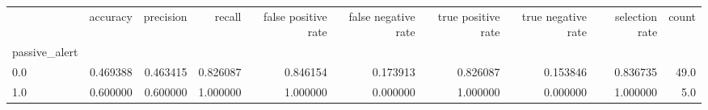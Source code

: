 \begin{tabular}{lrrrrrrrrr}
\toprule
{} &  accuracy &  precision &    recall &  false positive rate &  false negative rate &  true positive rate &  true negative rate &  selection rate &  count \\
passive\_alert &           &            &           &                      &                      &                     &                     &                 &        \\
\midrule
0.0           &  0.469388 &   0.463415 &  0.826087 &             0.846154 &             0.173913 &            0.826087 &            0.153846 &        0.836735 &   49.0 \\
1.0           &  0.600000 &   0.600000 &  1.000000 &             1.000000 &             0.000000 &            1.000000 &            0.000000 &        1.000000 &    5.0 \\
\bottomrule
\end{tabular}
